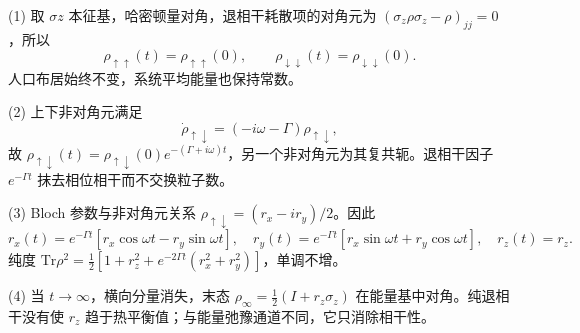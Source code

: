 (1) 取 \(\sigma z\) 本征基，哈密顿量对角，退相干耗散项的对角元为 \((\sigma_z\rho\sigma_z-\rho)_{jj}=0\)，所以
\[
\rho_{\uparrow\uparrow}(t)=\rho_{\uparrow\uparrow}(0),\qquad
\rho_{\downarrow\downarrow}(t)=\rho_{\downarrow\downarrow}(0).
\]
人口布居始终不变，系统平均能量也保持常数。

(2) 上下非对角元满足
\[
\dot\rho_{\uparrow\downarrow}=(-i\omega-\Gamma)\rho_{\uparrow\downarrow},
\]
故 \(\rho_{\uparrow\downarrow}(t)=\rho_{\uparrow\downarrow}(0)e^{-(\Gamma+i\omega)t}\)，另一个非对角元为其复共轭。退相干因子 \(e^{-\Gamma t}\) 抹去相位相干而不交换粒子数。

(3) Bloch 参数与非对角元关系 \(\rho_{\uparrow\downarrow}=(r_x-ir_y)/2\)。因此
\[
r_x(t)=e^{-\Gamma t}[r_x\cos\omega t-r_y\sin\omega t],
\quad
r_y(t)=e^{-\Gamma t}[r_x\sin\omega t+r_y\cos\omega t],
\quad r_z(t)=r_z.
\]
纯度 \(\mathrm{Tr}\rho^2=\frac12[1+r_z^2+e^{-2\Gamma t}(r_x^2+r_y^2)]\)，单调不增。

(4) 当 \(t\to \infty \)，横向分量消失，末态 \(\rho_\infty=\frac12(I+r_z\sigma_z)\) 在能量基中对角。纯退相干没有使 \(r_z\) 趋于热平衡值；与能量弛豫通道不同，它只消除相干性。
